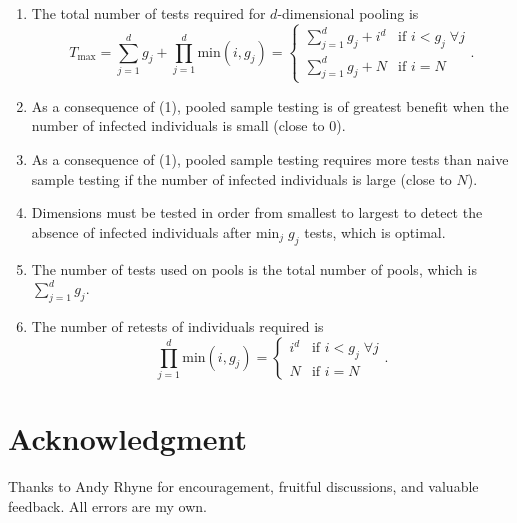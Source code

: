 \documentclass[letterpaper]{article}
\begin{document}
\begin{enumerate}
\def\labelenumi{\arabic{enumi}.}
\item
The total number of tests required for $d$-dimensional pooling is
\[
T_{\text{max}}=\sum_{j=1}^d g_j + \prod_{j=1}^d \text{min}(i, g_j) =
\begin{cases} 
\sum_{j=1}^d g_j + i^d& \text{if }i<g_j\; \forall j \\ 
\sum_{j=1}^d g_j + N & \text{if }i=N 
\end{cases}.
\]
\item
As a consequence of (1), pooled sample testing is of greatest benefit
when the number of infected individuals is small (close to 0).
\item
As a consequence of (1), pooled sample testing requires more tests
than naive sample testing if the number of infected individuals is
large (close to $N$).
\item
Dimensions must be tested in order from smallest to largest to detect
the absence of infected individuals after $\text{min}_j \;g_j$
tests, which is optimal.
\item
The number of tests used on pools is the total number of pools, which
is $\sum_{j=1}^d g_j$.
\item
The number of retests of individuals required is
\[
\prod_{j=1}^d \text{min}(i, g_j) = 
\begin{cases} 
i^d& \text{if }i<g_j\;\forall j \\
N & \text{if }i=N \end{cases}.\]
\end{enumerate}


\section*{Acknowledgment}
Thanks to Andy Rhyne for encouragement, fruitful discussions, and valuable feedback.
All errors are my own.
\end{document}
